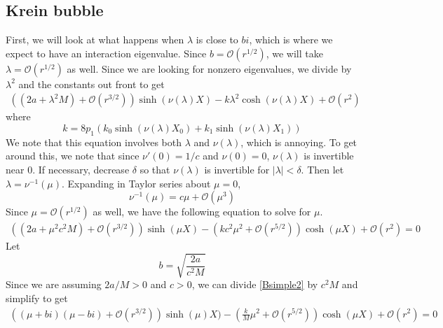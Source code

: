\documentclass[thesis.tex]{subfiles}
\begin{document}
\subsection{Krein bubble}

First, we will look at what happens when $\lambda$ is close to $bi$, which is where we expect to have an interaction eigenvalue. Since $b = \mathcal{O}(r^{1/2})$, we will take $\lambda = \mathcal{O}(r^{1/2})$ as well. Since we are looking for nonzero eigenvalues, we divide by $\lambda^2$ and the constants out front to get
\begin{equation}\label{Bsimple1}
\begin{aligned}
\left((2a + \lambda^2 M) +  \mathcal{O}( r^{3/2} )\right) \sinh(\nu(\lambda)X) - k \lambda^2 \cosh(\nu(\lambda)X)+ \mathcal{O}( r^2 ) 
\end{aligned}
\end{equation}
where
\begin{equation}\label{2pdefk}
k = 8 p_1 ( k_0\sinh(\nu(\lambda)X_0) + k_1 \sinh(\nu(\lambda)X_1) ) 
\end{equation}
We note that this equation involves both $\lambda$ and $\nu(\lambda)$, which is annoying. To get around this, we note that since $\nu'(0) = 1/c$ and $\nu(0) = 0$, $\nu(\lambda)$ is invertible near 0. If necessary, decrease $\delta$ so that $\nu(\lambda)$ is invertible for $|\lambda| < \delta$. Then let $\lambda = \nu^{-1}(\mu)$. Expanding in Taylor series about $\mu = 0$, 
\[
\nu^{-1}(\mu) = c \mu + \mathcal{O}(\mu^3)
\]
Since $\mu = \mathcal{O}(r^{1/2})$ as well, we have the following equation to solve for $\mu$.
\begin{equation}\label{Bsimple2}
\begin{aligned}
\left((2a + \mu^2 c^2 M) +  \mathcal{O}( r^{3/2} )\right) \sinh(\mu X) - \left(k c^2 \mu^2 + \mathcal{O}( r^{5/2} ) \right)\cosh(\mu X)+ \mathcal{O}( r^2 ) = 0
\end{aligned}
\end{equation}
Let
\[
b = \sqrt{\frac{2a}{c^2 M}}
\]
Since we are assuming $2a/M > 0$ and $c>0$, we can divide \cref{Bsimple2} by $c^2 M$ and simplify to get
\begin{equation}\label{Bsimple2}
\begin{aligned}
\left((\mu + b i)(\mu - b i) +  \mathcal{O}( r^{3/2} )\right) \sinh(\mu )X) - \left(\frac{k}{M} \mu^2 + \mathcal{O}( r^{5/2} ) \right)\cosh(\mu X)+ \mathcal{O}( r^2 ) = 0
\end{aligned}
\end{equation}
\end{document}
